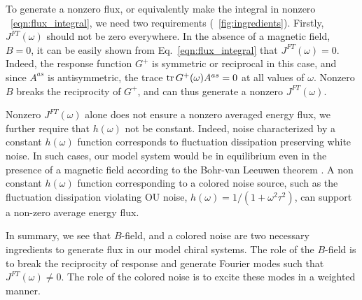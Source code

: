 \documentclass[
 preprint,
 preprintnumbers,
 amsmath,amssymb,
 aps,
 pre,
 longbibliography,
 superscriptaddress,
 10pt, twocolumn
]{revtex4-1}
\begin{document}
To generate a nonzero flux, or equivalently make the integral in nonzero \eqnname~\eqref{eqn:flux_integral}, we need two requirements (\figurename~\ref{fig:ingredients}).
Firstly, $J^{FT}(\omega)$ should not be zero everywhere.
In the absence of a magnetic field, $B=0$, it can be easily shown from Eq.~\ref{eqn:flux_integral} that $J^{FT}(\omega)=0$. Indeed, the response function $G^+$ is symmetric or reciprocal in this case, and since $A^{as}$ is antisymmetric, the trace $\tr G^+(\omega) A^{as}=0$ at all values of $\omega$. Nonzero $B$ breaks the reciprocity of $G^+$, and can thus generate a nonzero $J^{FT}(\omega)$. 

Nonzero $J^{FT}(\omega)$ alone does not ensure a nonzero averaged energy flux, we further require that $h(\omega)$ not be constant.
Indeed, noise characterized by a constant $h(\omega)$ function corresponds to fluctuation dissipation preserving white noise. In such cases, our model system would be in equilibrium even in the presence of a magnetic field according to the Bohr-van Leeuwen theorem \cite{Pradhan2010NonexistenceClassical}.
A non constant $h(\omega)$ function corresponding to a colored noise source, such as the fluctuation dissipation violating OU noise, $h(\omega)=1/(1+\omega^2\tau^2)$, can support a non-zero average energy flux. 

In summary, we see that $B$-field, and a colored noise are two necessary ingredients to generate flux in our model chiral systems.
The role of the $B$-field is to break the reciprocity of response and generate Fourier modes such that $J^{FT}(\omega)\neq 0$. The role of the colored noise is to excite these modes in a weighted manner.
\end{document}
